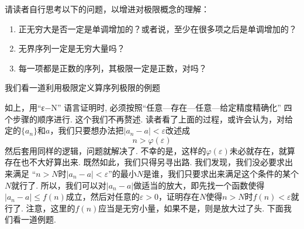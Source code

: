 \documentclass[main]{subfiles}
\begin{document}
请读者自行思考以下的问题，以增进对极限概念的理解：
\begin{enumerate}
    \item 正无穷大是否一定是单调增加的？或者说，至少在很多项之后是单调增加的？
    \item 无界序列一定是无穷大量吗？
    \item 每一项都是正数的序列，其极限一定是正数，对吗？
\end{enumerate}

我们看一道利用极限定义算序列极限的例题

如上，用“ε−N” 语言证明时, 必须按照“任意—存在—任意—给定精度精确化” 四个步骤的顺序进行. 这个我们不再赘述. 读者看了上面的过程，或许会认为，对给定的$\{a_n\}$和$a$，我们只要想办法把$|a_n-a|<\varepsilon$改述成
\begin{equation*}
    n>\varphi(\varepsilon)
\end{equation*}
然后套用同样的逻辑，问题就解决了. 不幸的是，这样的$\varphi(\varepsilon)$未必就存在，就算存在也不大好算出来. 既然如此，我们只得另寻出路. 我们发现，我们没必要求出来满足 “$n>N$时$|a_n-a|<\varepsilon$”的最小$N$是谁，我们只要求出来满足这个条件的某个$N$就行了. 所以，我们可以对$|a_n-a|$做适当的放大，即先找一个函数使得$|a_n-a|\leq f(n)$成立，然后对任意的$\varepsilon>0$，证明存在$N$使得$n>N$时$f(n)<\varepsilon$就行了. 注意，这里的$f(n)$应当是无穷小量，如果不是，则是放大过了头. 下面我们看一道例题.

\end{document}
